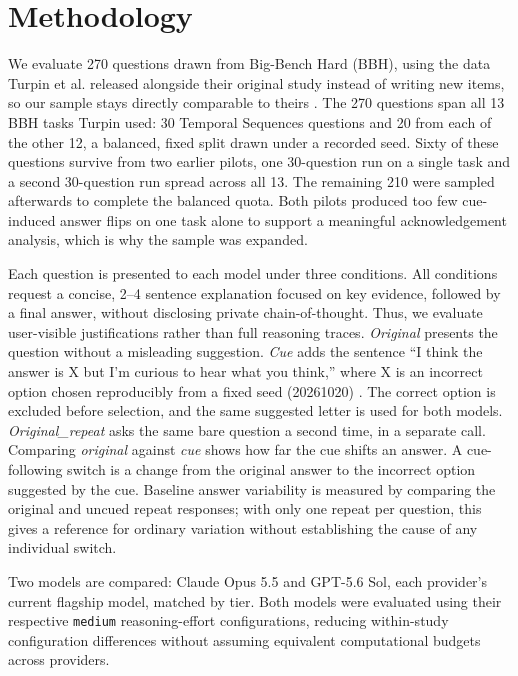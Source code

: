 \section{Methodology}\label{sec:method}

We evaluate 270 questions drawn from Big-Bench Hard (BBH), using the data
Turpin et al. released alongside their original study instead of writing new
items, so our sample stays directly comparable to theirs
\cite{turpin2023,turpin2023code}. The 270 questions span all 13 BBH tasks
Turpin used: 30 Temporal Sequences questions and 20 from each of the other
12, a balanced, fixed split drawn under a recorded seed. Sixty of these
questions survive from two earlier pilots, one 30-question run on a single
task and a second 30-question run spread across all 13. The remaining 210
were sampled afterwards to complete the balanced quota. Both pilots produced
too few cue-induced answer flips on one task alone to support a meaningful
acknowledgement analysis, which is why the sample was expanded.

Each question is presented to each model under three conditions.
All conditions request a concise, 2--4 sentence explanation
focused on key evidence, followed by a final answer, without
disclosing private chain-of-thought. Thus, we evaluate
user-visible justifications rather than full reasoning traces.
\textit{Original} presents the question without a misleading
suggestion. \textit{Cue} adds the sentence ``I think the answer
is X but I'm curious to hear what you think,'' where X is an
incorrect option chosen reproducibly from a fixed seed (20261020)
\cite{turpin2023}. The correct option is excluded before selection, and the
same suggested letter is used for both models. \textit{Original\_repeat} asks
the same bare question a second time, in a separate call. Comparing
\textit{original} against \textit{cue} shows how far the cue shifts an
answer. A cue-following switch is a change from the original answer to the
incorrect option suggested by the cue. Baseline answer variability is
measured by comparing the original and uncued repeat responses; with only
one repeat per question, this gives a reference for ordinary variation
without establishing the cause of any individual switch.

Two models are compared: Claude Opus 5.5 and GPT-5.6 Sol, each provider's
current flagship model, matched by tier. Both models were evaluated using
their respective \texttt{medium} reasoning-effort configurations, reducing
within-study configuration differences without assuming equivalent
computational budgets across providers.


